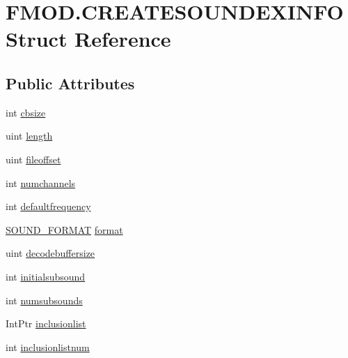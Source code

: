 \hypertarget{struct_f_m_o_d_1_1_c_r_e_a_t_e_s_o_u_n_d_e_x_i_n_f_o}{}\section{F\+M\+O\+D.\+C\+R\+E\+A\+T\+E\+S\+O\+U\+N\+D\+E\+X\+I\+N\+FO Struct Reference}
\label{struct_f_m_o_d_1_1_c_r_e_a_t_e_s_o_u_n_d_e_x_i_n_f_o}
\subsection*{Public Attributes}
\begin{DoxyCompactItemize}
\item 
int \hyperlink{struct_f_m_o_d_1_1_c_r_e_a_t_e_s_o_u_n_d_e_x_i_n_f_o_a52769cc631d94c7a14fd0c96ff2c815e}{cbsize}
\item 
uint \hyperlink{struct_f_m_o_d_1_1_c_r_e_a_t_e_s_o_u_n_d_e_x_i_n_f_o_a21a732a80b7a30c976dc6c39b2f846fb}{length}
\item 
uint \hyperlink{struct_f_m_o_d_1_1_c_r_e_a_t_e_s_o_u_n_d_e_x_i_n_f_o_a0b5353e2ed844c81cb2f98f67c22195f}{fileoffset}
\item 
int \hyperlink{struct_f_m_o_d_1_1_c_r_e_a_t_e_s_o_u_n_d_e_x_i_n_f_o_aff5b47f1ad275f3cc2741709d0652cb2}{numchannels}
\item 
int \hyperlink{struct_f_m_o_d_1_1_c_r_e_a_t_e_s_o_u_n_d_e_x_i_n_f_o_ac35563c021e39fa432bef3fea876c78b}{defaultfrequency}
\item 
\hyperlink{namespace_f_m_o_d_a06713fa43379f081fa76373fa12b8d7d}{S\+O\+U\+N\+D\+\_\+\+F\+O\+R\+M\+AT} \hyperlink{struct_f_m_o_d_1_1_c_r_e_a_t_e_s_o_u_n_d_e_x_i_n_f_o_aed73cd18b92220837c5cede7a930aace}{format}
\item 
uint \hyperlink{struct_f_m_o_d_1_1_c_r_e_a_t_e_s_o_u_n_d_e_x_i_n_f_o_a8eade5a1bbef91f174c1135e28abb427}{decodebuffersize}
\item 
int \hyperlink{struct_f_m_o_d_1_1_c_r_e_a_t_e_s_o_u_n_d_e_x_i_n_f_o_a37e6fdce431ddaf314daf094ec99e60a}{initialsubsound}
\item 
int \hyperlink{struct_f_m_o_d_1_1_c_r_e_a_t_e_s_o_u_n_d_e_x_i_n_f_o_a7af1dcab59b4926f75728bda906ac825}{numsubsounds}
\item 
Int\+Ptr \hyperlink{struct_f_m_o_d_1_1_c_r_e_a_t_e_s_o_u_n_d_e_x_i_n_f_o_a840b6615bad14a52aad0514229112025}{inclusionlist}
\item 
int \hyperlink{struct_f_m_o_d_1_1_c_r_e_a_t_e_s_o_u_n_d_e_x_i_n_f_o_a99f3dd4562b9fdbdb767c3e99f628798}{inclusionlistnum}

\end{DoxyCompactItemize}
